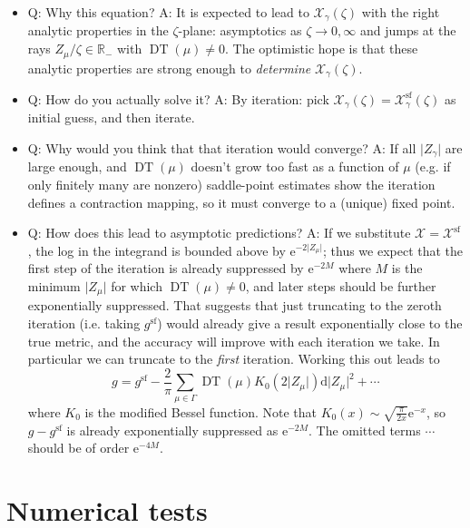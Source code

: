 \documentclass[12pt,letterpaper,reqno]{article}
\numberwithin{equation}{section}
\newcommand{\cX}{\ensuremath{\mathcal X}}
\newcommand{\R}{\ensuremath{\mathbb R}}
\newcommand{\e}{{\mathrm e}}
\newcommand{\de}{\mathrm{d}}
\renewcommand{\sf}{\mathrm{sf}}
\newcommand{\abs}[1]{\lvert#1\rvert}
\newcommand{\ti}[1]{\textit{#1}}
\DeclareMathOperator{\DT}{DT}
\begin{document}
\begin{itemize}
  \item Q: Why this equation? A: It is expected to lead to $\cX_\gamma(\zeta)$ with
  the right analytic properties in the $\zeta$-plane: asymptotics as $\zeta \to 0,\infty$
  and jumps at the rays $Z_\mu / \zeta \in \R_-$ with $\DT(\mu) \neq 0$.
  The optimistic hope is that these analytic properties are strong enough
  to \ti{determine} $\cX_\gamma(\zeta)$.

  \item Q: How do you actually solve it? A: By iteration: pick
  $\cX_\gamma(\zeta) = \cX_\gamma^\sf(\zeta)$ as initial guess, 
  and then iterate.

  \item Q: Why would you think that that iteration would converge?
  A: If all $\abs{Z_\gamma}$ are large enough, and $\DT(\mu)$ doesn't grow too fast
  as a function of $\mu$ (e.g. if only finitely many are nonzero)
  saddle-point estimates show 
  the iteration defines a contraction mapping, so it must
  converge to a (unique) fixed point.

  \item Q: How does this lead to asymptotic predictions? A: 
  If we substitute $\cX = \cX^\sf$, the log in the
  integrand is bounded above by $\e^{-2 \abs{Z_\mu}}$;
  thus we expect that the first step of the iteration is already
  suppressed by $\e^{-2 M}$ where $M$ is the minimum $\abs{Z_\mu}$
  for which $\DT(\mu) \neq 0$, and later steps
  should be further exponentially suppressed. That suggests
  that just truncating to the zeroth iteration (i.e. taking $g^\sf$)
  would already give a result exponentially close to the true metric,
  and the accuracy will improve with each iteration we take.
  In particular we can truncate to the \ti{first} iteration.
  Working this out leads to
  \begin{equation}
    g = g^\sf - \frac{2}{\pi} \sum_{\mu \in \Gamma} \DT(\mu) K_0\left( 2 \abs{Z_\mu} \right) \de \abs{Z_\mu}^2 + \cdots
  \end{equation}
  where $K_0$ is the modified Bessel function.
  Note that $K_0(x) \sim \sqrt{\frac{\pi}{2x}} \e^{-x}$,
  so $g - g^\sf$ is already exponentially suppressed as $\e^{-2M}$.
  The omitted terms $\cdots$ should be of order $\e^{-4M}$.
\end{itemize}


\section{Numerical tests}
\end{document}
